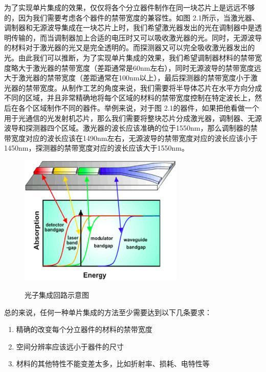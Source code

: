 \documentclass{ZJUthesis}
\begin{document}
为了实现单片集成的效果，仅仅将各个分立器件制作在同一块芯片上是远远不够的，因为我们需要考虑各个器件的禁带宽度的兼容性。如图 2.1所示，当激光器、调制器和无源波导集成在一块芯片上时，我们希望激光器发出的光在调制器中是透明传输的，而当调制器加上合适的电压时又可以吸收激光器的光。同时，无源波导的材料对于激光器的光又是完全透明的。而探测器又可以完全吸收激光器发出的光。由此我们可以推断，为了实现单片集成的效果，我们希望调制器材料的禁带宽度略大于激光器的禁带宽度（差距通常是60nm左右），同时无源波导的禁带宽度远大于激光器的禁带宽度（差距通常在100nm以上），最后探测器的禁带宽度小于激光器的禁带宽度。从制作工艺的角度来说，我们需要将半导体芯片在水平方向分成不同的区域，并且非常精确地将每个区域的材料的禁带宽度控制在特定波长上，然后在各个区域制作不同的器件。举例来说，对于图 2.1的器件，如果把他看做一个用于光通信的光发射机芯片，那么我们需要将整块芯片分成激光器，调制器、无源波导和探测器四个区域。激光器的波长应该准确的位于1550nm，那么调制器的禁带宽度对应的波长应该在1490nm左右，无源波导的禁带宽度对应的波长应该小于1450nm，探测器的禁带宽度对应的波长应该大于1550nm。

\begin{figure}[!ht]
  \centering
  \includegraphics[width=0.7\textwidth]{./Pictures/pic.eps}\\
  \caption{光子集成回路示意图}
  \label{fig_pic}
\end{figure}

总的来说，任何一种单片集成的方法至少需要达到以下几条要求：

\begin{enumerate}
\item{精确的改变每个分立器件的材料的禁带宽度}
\item{空间分辨率应该远小于器件的尺寸}
\item{材料的其他特性不能变差太多，比如折射率、损耗、电特性等}
\end{enumerate}
\end{document}
